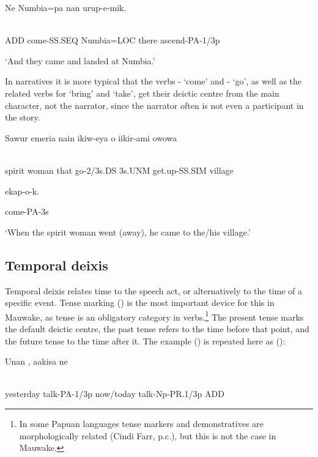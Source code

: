 \ea%
\label{ex:x1892}
\gll Ne    Numbia=pa  nan  urup-e-mik. \\
      \\
\glt
\z

ADD  come-SS.SEQ  Numbia=LOC  there  ascend-PA-1/3p

`And they came and landed at Numbia.'

In narratives it is more typical that the verbs - `come' and - `go', as well as the related verbs for `bring' and `take', get their deictic centre from the main character, not the narrator, since the narrator often is not even a participant in the story. 

\ea%
\label{ex:x1277}
\gll Sawur  emeria  nain  ikiw-eya  o  iikir-ami  owowa  \\
      \\
\glt
\z

spirit  woman  that  go-2/3s.DS  3s.UNM  get.up-SS.SIM  village

ekap-o-k.

come-PA-3s

`When the spirit woman went (away), he came to the/his village.'

\subsection{Temporal deixis}
\hypertarget{RefHeading22541935131865}{}
Temporal deixis relates time to the speech act, or alternatively to the time of a specific event. Tense marking () is the most important device for this in Mauwake, as tense is an obligatory category in verbs.\footnote{In some Papuan languages tense markers and demonstratives are morphologically related (Cindi Farr, p.c.), but this is not the case in Mauwake.} The present tense marks the default deictic centre, the past tense refers to the time before that point, and the future tense to the time after it. The example () is repeated here as ():

\ea%
\label{ex:x1893}
\gll Unan  ,  aakisa    ne \\
      \\
\glt
\z

yesterday  talk-PA-1/3p  now/today  talk-Np-PR.1/3p  ADD

